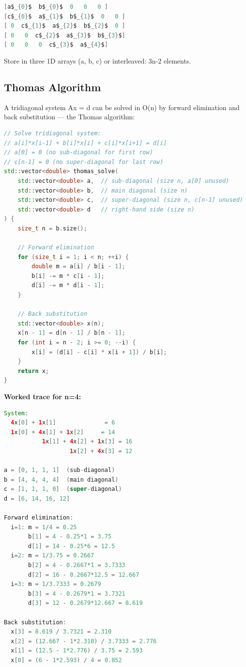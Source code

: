 \begin{lstlisting}[language=Java]
[a$_{0}$  b$_{0}$  0   0   0 ]
[c$_{0}$  a$_{1}$  b$_{1}$  0   0 ]
[ 0  c$_{1}$  a$_{2}$  b$_{2}$  0 ]
[ 0   0  c$_{2}$  a$_{3}$  b$_{3}$]
[ 0   0   0  c$_{3}$  a$_{4}$]
\end{lstlisting}

Store in three 1D arrays (a, b, c) or interleaved: 3n-2 elements.

\subsection{Thomas Algorithm}

A tridiagonal system Ax = d can be solved in O(n) by forward elimination and back substitution — the Thomas algorithm:

\begin{lstlisting}[language=C++]
// Solve tridiagonal system:
// a[i]*x[i-1] + b[i]*x[i] + c[i]*x[i+1] = d[i]
// a[0] = 0 (no sub-diagonal for first row)
// c[n-1] = 0 (no super-diagonal for last row)
std::vector<double> thomas_solve(
    std::vector<double> a,  // sub-diagonal (size n, a[0] unused)
    std::vector<double> b,  // main diagonal (size n)
    std::vector<double> c,  // super-diagonal (size n, c[n-1] unused)
    std::vector<double> d   // right-hand side (size n)
) {
    size_t n = b.size();

    // Forward elimination
    for (size_t i = 1; i < n; ++i) {
        double m = a[i] / b[i - 1];
        b[i] -= m * c[i - 1];
        d[i] -= m * d[i - 1];
    }

    // Back substitution
    std::vector<double> x(n);
    x[n - 1] = d[n - 1] / b[n - 1];
    for (int i = n - 2; i >= 0; --i) {
        x[i] = (d[i] - c[i] * x[i + 1]) / b[i];
    }
    return x;
}
\end{lstlisting}

\textbf{Worked trace for n=4:}
\begin{lstlisting}[language=Java]
System:
  4x[0] + 1x[1]              = 6
  1x[0] + 4x[1] + 1x[2]     = 14
           1x[1] + 4x[2] + 1x[3] = 16
                   1x[2] + 4x[3] = 12

a = [0, 1, 1, 1]  (sub-diagonal)
b = [4, 4, 4, 4]  (main diagonal)
c = [1, 1, 1, 0]  (super-diagonal)
d = [6, 14, 16, 12]

Forward elimination:
  i=1: m = 1/4 = 0.25
       b[1] = 4 - 0.25*1 = 3.75
       d[1] = 14 - 0.25*6 = 12.5
  i=2: m = 1/3.75 = 0.2667
       b[2] = 4 - 0.2667*1 = 3.7333
       d[2] = 16 - 0.2667*12.5 = 12.667
  i=3: m = 1/3.7333 = 0.2679
       b[3] = 4 - 0.2679*1 = 3.7321
       d[3] = 12 - 0.2679*12.667 = 8.619

Back substitution:
  x[3] = 8.619 / 3.7321 = 2.310
  x[2] = (12.667 - 1*2.310) / 3.7333 = 2.776
  x[1] = (12.5 - 1*2.776) / 3.75 = 2.593
  x[0] = (6 - 1*2.593) / 4 = 0.852
\end{lstlisting}

